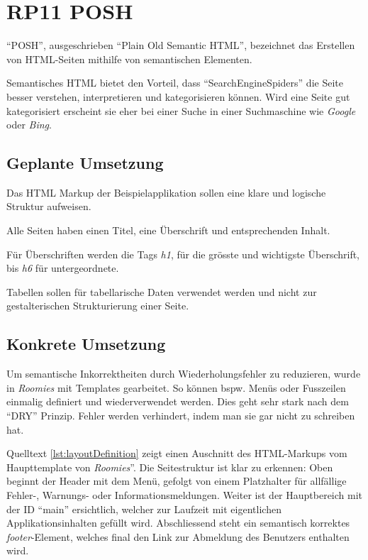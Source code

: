 \section{RP11 POSH}
\label{sec:principle-rp11-posh}

``POSH'', ausgeschrieben ``Plain Old Semantic HTML'', bezeichnet das Erstellen von HTML-Seiten mithilfe von semantischen Elementen. \cite{SemanticHTML}

Semantisches HTML bietet den Vorteil, dass ``\glspl{SearchEngineSpider}'' die Seite besser verstehen, interpretieren und kategorisieren können. Wird eine Seite gut kategorisiert erscheint sie eher bei einer Suche in einer Suchmaschine wie \emph{Google} oder \emph{Bing}.

\subsection*{Geplante Umsetzung}
Das HTML Markup der Beispielapplikation sollen eine klare und logische Struktur aufweisen.

Alle Seiten haben einen Titel, eine Überschrift und entsprechenden Inhalt.

Für Überschriften werden die Tags \emph{h1}, für die grösste und wichtigste Überschrift, bis \emph{h6} für untergeordnete.

Tabellen sollen für tabellarische Daten verwendet werden und nicht zur gestalterischen Strukturierung einer Seite.


\subsection*{Konkrete Umsetzung}
Um semantische Inkorrektheiten durch Wiederholungsfehler zu reduzieren, wurde in \emph{Roomies} mit Templates gearbeitet. So können bspw. Menüs oder Fusszeilen einmalig definiert und wiederverwendet werden. Dies geht sehr stark nach dem ``\gls{DRY}'' Prinzip. Fehler werden verhindert, indem man sie gar nicht zu schreiben hat.

Quelltext \ref{lst:layoutDefinition} zeigt einen Auschnitt des HTML-Markups vom Haupttemplate von \emph{Roomies}''. Die Seitestruktur ist klar zu erkennen: Oben beginnt der Header mit dem Menü, gefolgt von einem Platzhalter für allfällige Fehler-, Warnungs- oder Informationsmeldungen. Weiter ist der Hauptbereich mit der ID ``main'' ersichtlich, welcher zur Laufzeit mit eigentlichen Applikationsinhalten gefüllt wird. Abschliessend steht ein semantisch korrektes \emph{footer}-Element, welches final den Link zur Abmeldung des Benutzers enthalten wird.

